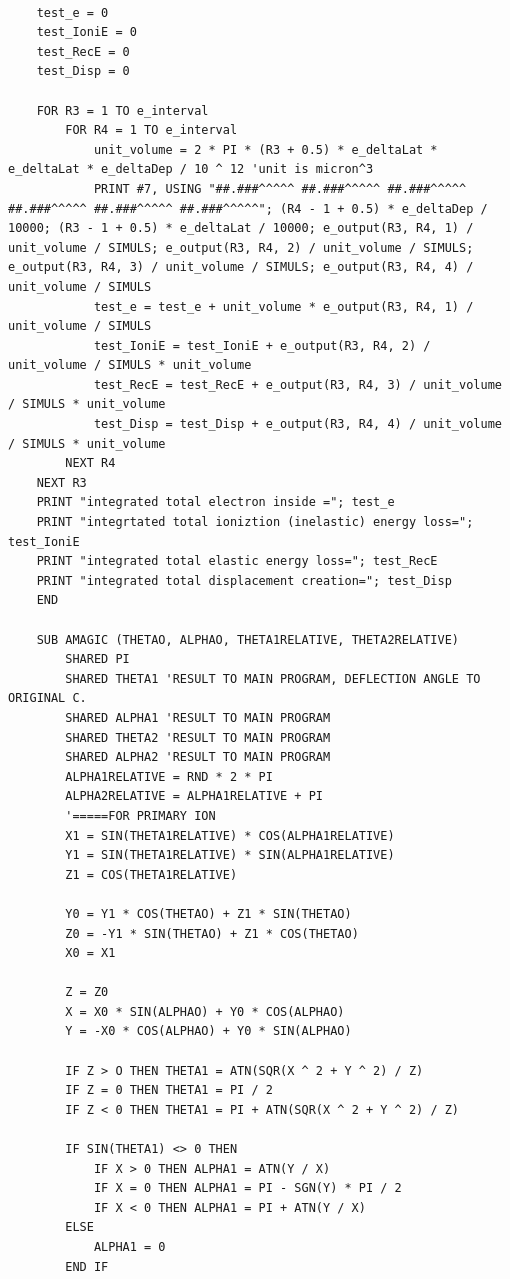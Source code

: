 \documentclass[10pt, reqno]{exam}
\begin{document}
\begin{verbatim}
    
    test_e = 0
    test_IoniE = 0
    test_RecE = 0
    test_Disp = 0
    
    FOR R3 = 1 TO e_interval
        FOR R4 = 1 TO e_interval
            unit_volume = 2 * PI * (R3 + 0.5) * e_deltaLat * e_deltaLat * e_deltaDep / 10 ^ 12 'unit is micron^3
            PRINT #7, USING "##.###^^^^^ ##.###^^^^^ ##.###^^^^^ ##.###^^^^^ ##.###^^^^^ ##.###^^^^^"; (R4 - 1 + 0.5) * e_deltaDep / 10000; (R3 - 1 + 0.5) * e_deltaLat / 10000; e_output(R3, R4, 1) / unit_volume / SIMULS; e_output(R3, R4, 2) / unit_volume / SIMULS; e_output(R3, R4, 3) / unit_volume / SIMULS; e_output(R3, R4, 4) / unit_volume / SIMULS
            test_e = test_e + unit_volume * e_output(R3, R4, 1) / unit_volume / SIMULS
            test_IoniE = test_IoniE + e_output(R3, R4, 2) / unit_volume / SIMULS * unit_volume
            test_RecE = test_RecE + e_output(R3, R4, 3) / unit_volume / SIMULS * unit_volume
            test_Disp = test_Disp + e_output(R3, R4, 4) / unit_volume / SIMULS * unit_volume
        NEXT R4
    NEXT R3
    PRINT "integrated total electron inside ="; test_e
    PRINT "integrtated total ioniztion (inelastic) energy loss="; test_IoniE
    PRINT "integrated total elastic energy loss="; test_RecE
    PRINT "integrated total displacement creation="; test_Disp
    END
    
    SUB AMAGIC (THETAO, ALPHAO, THETA1RELATIVE, THETA2RELATIVE)
        SHARED PI
        SHARED THETA1 'RESULT TO MAIN PROGRAM, DEFLECTION ANGLE TO ORIGINAL C.
        SHARED ALPHA1 'RESULT TO MAIN PROGRAM
        SHARED THETA2 'RESULT TO MAIN PROGRAM
        SHARED ALPHA2 'RESULT TO MAIN PROGRAM
        ALPHA1RELATIVE = RND * 2 * PI
        ALPHA2RELATIVE = ALPHA1RELATIVE + PI
        '=====FOR PRIMARY ION
        X1 = SIN(THETA1RELATIVE) * COS(ALPHA1RELATIVE)
        Y1 = SIN(THETA1RELATIVE) * SIN(ALPHA1RELATIVE)
        Z1 = COS(THETA1RELATIVE)
    
        Y0 = Y1 * COS(THETAO) + Z1 * SIN(THETAO)
        Z0 = -Y1 * SIN(THETAO) + Z1 * COS(THETAO)
        X0 = X1
    
        Z = Z0
        X = X0 * SIN(ALPHAO) + Y0 * COS(ALPHAO)
        Y = -X0 * COS(ALPHAO) + Y0 * SIN(ALPHAO)
    
        IF Z > O THEN THETA1 = ATN(SQR(X ^ 2 + Y ^ 2) / Z)
        IF Z = 0 THEN THETA1 = PI / 2
        IF Z < 0 THEN THETA1 = PI + ATN(SQR(X ^ 2 + Y ^ 2) / Z)
    
        IF SIN(THETA1) <> 0 THEN
            IF X > 0 THEN ALPHA1 = ATN(Y / X)
            IF X = 0 THEN ALPHA1 = PI - SGN(Y) * PI / 2
            IF X < 0 THEN ALPHA1 = PI + ATN(Y / X)
        ELSE
            ALPHA1 = 0
        END IF
    

\end{verbatim}
\end{document}
